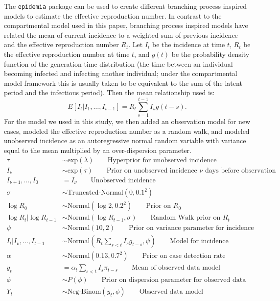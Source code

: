 The \texttt{epidemia} package can be used to create different branching process inspired models to estimate the effective reproduction number. In contrast to the compartmental model used in this paper, branching process inspired models have related the mean of current incidence to a weighted sum of previous incidence and the effective reproduction number $R_{t}$. Let $I_{t}$ be the incidence at time $t$, $R_{t}$ be the effective reproduction number at time $t$, and $g(t)$ be the probability density function of the generation time distribution (the time between an individual becoming infected and infecting another individual; under the compartmental model framework this is usually taken to be equivalent to the sum of the latent period and the infectious period). Then the mean relationship used is:
\begin{equation*}
    E[I_{t}|I_{1}, \dots, I_{t-1}] = R_{t}\sum_{s=1}^{t-1}I_{s}g(t-s).
\end{equation*}
For the model we used in this study, we then added an observation model for new cases, modeled the effective reproduction number as a random walk, and modeled unobserved incidence as an autoregressive normal random variable with variance equal to the mean multiplied by an over-dispersion parameter.
 \begin{align*}
\tau &\sim \text{exp}(\lambda)  \quad \quad \text{Hyperprior for unobserved incidence}\\
I_{\nu} &\sim \text{exp}(\tau) \quad \quad \text{Prior on unobserved incidence $\nu$ days before observation}\\
I_{\nu+1}, \dots, I_{0} &= I_{\nu}  \quad \quad \text{Unobserved incidence}\\
    \sigma & \sim \text{Truncated-Normal}(0, 0.1^{2}) \\
   \log{R_{0}} &\sim \text{Normal}(\log{2}, 0.2^{2})\quad \quad \text{Prior on $R_{0}$} \\
    \log{R_{t}}|\log{R_{t-1}} &\sim \text{Normal}(\log{R_{t-1}}, \sigma)  \quad \quad \text{Random Walk prior on $R_{t}$}\\
\psi &\sim \text{Normal}(10,2) \quad \quad \text{Prior on variance parameter for incidence} \\
I_{t}|I_{\nu}, \dots, I_{t-1} &\sim \text{Normal}(R_{t}\sum_{s<t}I_{s}g_{t-s}, \psi) \quad \quad \text{Model for incidence} \\
    \alpha &\sim \text{Normal}(0.13, 0.7^2)
\quad \quad \text{Prior on case detection rate} \\
y_{t} &= \alpha_{t}\sum_{s<t}I_{s}\pi_{t-s} \quad \quad \text{Mean of observed data model}\\
\phi & \sim P(\phi) \quad \quad \text{Prior on dispersion parameter for observed data} \\
Y_{t} &\sim \text{Neg-Binom}(y_{t}, \phi) \quad \quad \text{Observed data model}\\
\end{align*}
